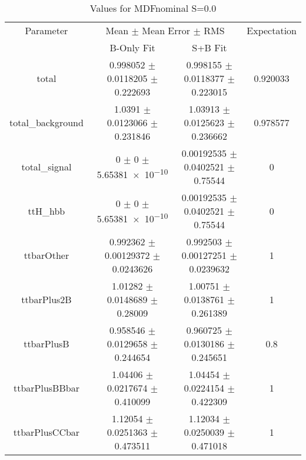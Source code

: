 \begin{table}
\centering
\caption{Values for MDFnominal S=0.0}
\begin{tabular}{cccc}
\toprule
Parameter & \multicolumn{2}{c}{Mean $\pm$ Mean Error $\pm$ RMS} & Expectation\\
 & B-Only Fit & S+B Fit & \\
\midrule
total & \num{0.998052} $\pm$ \num{0.0118205} $\pm$ \num{0.222693} & \num{0.998155} $\pm$ \num{0.0118377} $\pm$ \num{0.223015} & \num{0.920033}\\
total\_background & \num{1.0391} $\pm$ \num{0.0123066} $\pm$ \num{0.231846} & \num{1.03913} $\pm$ \num{0.0125623} $\pm$ \num{0.236662} & \num{0.978577}\\
total\_signal & \num{0} $\pm$ \num{0} $\pm$ \num{5.65381e-10} & \num{0.00192535} $\pm$ \num{0.0402521} $\pm$ \num{0.75544} & \num{0}\\
ttH\_hbb & \num{0} $\pm$ \num{0} $\pm$ \num{5.65381e-10} & \num{0.00192535} $\pm$ \num{0.0402521} $\pm$ \num{0.75544} & \num{0}\\
ttbarOther & \num{0.992362} $\pm$ \num{0.00129372} $\pm$ \num{0.0243626} & \num{0.992503} $\pm$ \num{0.00127251} $\pm$ \num{0.0239632} & \num{1}\\
ttbarPlus2B & \num{1.01282} $\pm$ \num{0.0148689} $\pm$ \num{0.28009} & \num{1.00751} $\pm$ \num{0.0138761} $\pm$ \num{0.261389} & \num{1}\\
ttbarPlusB & \num{0.958546} $\pm$ \num{0.0129658} $\pm$ \num{0.244654} & \num{0.960725} $\pm$ \num{0.0130186} $\pm$ \num{0.245651} & \num{0.8}\\
ttbarPlusBBbar & \num{1.04406} $\pm$ \num{0.0217674} $\pm$ \num{0.410099} & \num{1.04454} $\pm$ \num{0.0224154} $\pm$ \num{0.422309} & \num{1}\\
ttbarPlusCCbar & \num{1.12054} $\pm$ \num{0.0251363} $\pm$ \num{0.473511} & \num{1.12034} $\pm$ \num{0.0250039} $\pm$ \num{0.471018} & \num{1}\\
\bottomrule
\end{tabular}
\end{table}